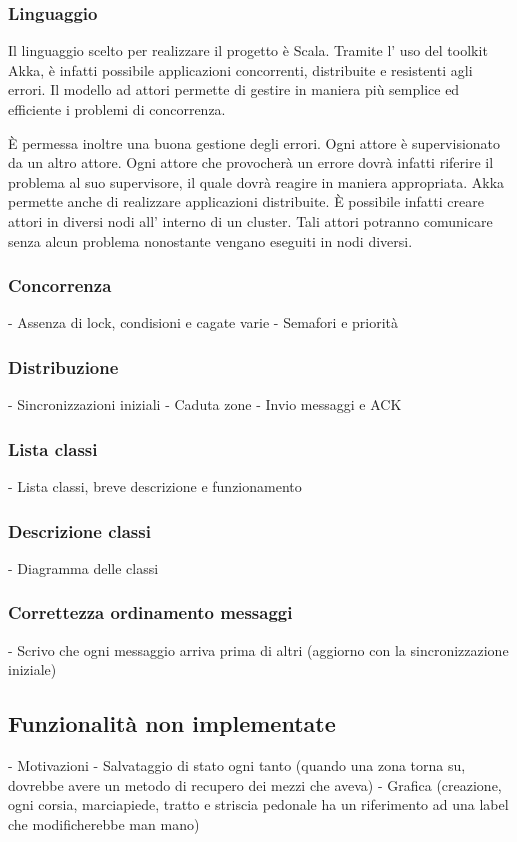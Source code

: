 \documentclass{article}
\begin{document}
\subsubsection{Linguaggio}
Il linguaggio scelto per realizzare il progetto \`{e} Scala. Tramite l\textquoteright{} uso del toolkit Akka, \`{e} infatti possibile applicazioni concorrenti, distribuite e resistenti agli errori. Il modello ad attori permette di gestire in maniera più semplice ed efficiente i problemi di concorrenza.

\`{E} permessa inoltre una buona gestione degli errori. Ogni attore \`{e} supervisionato da un altro attore. Ogni attore che provocher\`{a} un errore dovr\`{a} infatti riferire il problema al suo supervisore, il quale dovr\`{a} reagire in maniera appropriata.
Akka permette anche di realizzare applicazioni distribuite. \`{E} possibile infatti creare attori in diversi nodi all\textquoteright{} interno di un cluster. Tali attori potranno comunicare senza alcun problema nonostante vengano eseguiti in nodi diversi.
\subsubsection{Concorrenza}
- Assenza di lock, condisioni e cagate varie \newline
- Semafori e priorità
\subsubsection{Distribuzione}
- Sincronizzazioni iniziali \newline
- Caduta zone \newline
- Invio messaggi e ACK
\subsubsection{Lista classi}
- Lista classi, breve descrizione e funzionamento
\subsubsection{Descrizione classi}
- Diagramma delle classi
\subsubsection{Correttezza ordinamento messaggi}
- Scrivo che ogni messaggio arriva prima di altri (aggiorno con la sincronizzazione iniziale)
\subsection{Funzionalit\`{a} non implementate}
- Motivazioni \newline
- Salvataggio di stato ogni tanto (quando una zona torna su, dovrebbe avere un metodo di recupero dei mezzi che aveva) \newline
- Grafica (creazione, ogni corsia, marciapiede, tratto e striscia pedonale ha un riferimento ad una label che modificherebbe man mano) \newline
\end{document}
